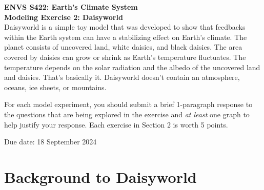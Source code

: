 \documentclass[11pt,letterpaper]{article}
\begin{document}
\textbf{ENVS S422: Earth's Climate System\\
Modeling Exercise 2: Daisyworld}\\%

Daisyworld is a simple toy model that was developed to show that feedbacks within the Earth system can have a stabilizing effect on Earth's climate. The planet consists of uncovered land, white daisies, and black daisies. The area covered by daisies can grow or shrink as Earth's temperature fluctuates. The temperature depends on the solar radiation and the albedo of the uncovered land and daisies. That's basically it. Daisyworld doesn't contain an atmosphere, oceans, ice sheets, or mountains.

For each model experiment, you should submit a brief 1-paragraph response to the questions that are being explored in the exercise and \textit{at least} one graph to help justify your response. Each exercise in Section 2 is worth 5 points.

Due date: 18 September 2024

\section{Background to Daisyworld}
\end{document}
